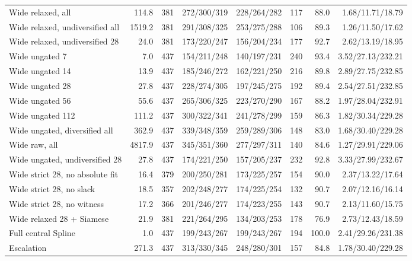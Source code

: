 \begin{tabular}{lrrrrrrr}
Wide relaxed, all & 114.8 & 381 & 272/300/319 & 228/264/282 & 117 & 88.0 & 1.68/11.71/18.79 \\
Wide relaxed, undiversified all & 1519.2 & 381 & 291/308/325 & 253/275/288 & 106 & 89.3 & 1.26/11.50/17.62 \\
Wide relaxed, undiversified 28 & 24.0 & 381 & 173/220/247 & 156/204/234 & 177 & 92.7 & 2.62/13.19/18.95 \\
Wide ungated 7 & 7.0 & 437 & 154/211/248 & 140/197/231 & 240 & 93.4 & 3.52/27.13/232.21 \\
Wide ungated 14 & 13.9 & 437 & 185/246/272 & 162/221/250 & 216 & 89.8 & 2.89/27.75/232.85 \\
Wide ungated 28 & 27.8 & 437 & 228/274/305 & 197/245/275 & 192 & 89.4 & 2.54/27.51/232.85 \\
Wide ungated 56 & 55.6 & 437 & 265/306/325 & 223/270/290 & 167 & 88.2 & 1.97/28.04/232.91 \\
Wide ungated 112 & 111.2 & 437 & 300/322/341 & 241/278/299 & 159 & 86.3 & 1.82/30.34/229.28 \\
Wide ungated, diversified all & 362.9 & 437 & 339/348/359 & 259/289/306 & 148 & 83.0 & 1.68/30.40/229.28 \\
Wide raw, all & 4817.9 & 437 & 345/351/360 & 277/297/311 & 140 & 84.6 & 1.27/29.91/229.06 \\
Wide ungated, undiversified 28 & 27.8 & 437 & 174/221/250 & 157/205/237 & 232 & 92.8 & 3.33/27.99/232.67 \\
Wide strict 28, no absolute fit & 16.4 & 379 & 200/250/281 & 173/225/257 & 154 & 90.0 & 2.37/13.22/17.64 \\
Wide strict 28, no slack & 18.5 & 357 & 202/248/277 & 174/225/254 & 132 & 90.7 & 2.07/12.16/16.14 \\
Wide strict 28, no witness & 17.2 & 366 & 201/246/277 & 174/223/255 & 143 & 90.7 & 2.13/11.60/15.75 \\
Wide relaxed 28 + Siamese & 21.9 & 381 & 221/264/295 & 134/203/253 & 178 & 76.9 & 2.73/12.43/18.59 \\
Full central Spline & 1.0 & 437 & 199/243/267 & 199/243/267 & 194 & 100.0 & 2.41/29.26/231.38 \\
Escalation & 271.3 & 437 & 313/330/345 & 248/280/301 & 157 & 84.8 & 1.78/30.40/229.28 \\
\bottomrule
\end{tabular}
